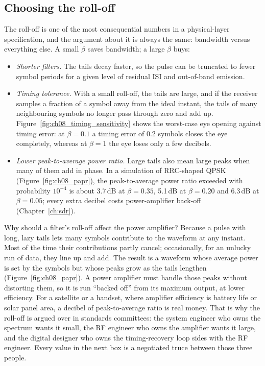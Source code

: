 \subsection{Choosing the roll-off}

The roll-off is one of the most consequential numbers in a physical-layer specification, and
the argument about it is always the same: bandwidth versus everything else. A small $\beta$
saves bandwidth; a large $\beta$ buys:
\begin{itemize}
\item \emph{Shorter filters.} The tails decay faster, so the pulse can be truncated to fewer
symbol periods for a given level of residual ISI and out-of-band emission.
\item \emph{Timing tolerance.} With a small roll-off, the tails are large, and if the receiver
samples a fraction of a symbol away from the ideal instant, the tails of many neighbouring
symbols no longer pass through zero and add up. Figure~\ref{fig:ch08_timing_sensitivity}
shows the worst-case eye opening against timing error: at $\beta=0.1$ a timing error of 0.2
symbols closes the eye completely, whereas at $\beta=1$ the eye loses only a few decibels.
\item \emph{Lower peak-to-average power ratio.} Large tails also mean large peaks when many of
them add in phase. In a simulation of RRC-shaped QPSK (Figure~\ref{fig:ch08_papr}), the
peak-to-average power ratio exceeded with probability $10^{-4}$ is about 3.7\,dB at
$\beta=0.35$, 5.1\,dB at $\beta=0.20$ and 6.3\,dB at $\beta=0.05$; every extra decibel costs
power-amplifier back-off (Chapter~\ref{ch:sdr}).
\end{itemize}



Why should a filter's roll-off affect the power amplifier? Because a pulse with long, lazy
tails lets many symbols contribute to the waveform at any instant. Most of the time their
contributions partly cancel; occasionally, for an unlucky run of data, they line up and add.
The result is a waveform whose average power is set by the symbols but whose peaks grow as the
tails lengthen (Figure~\ref{fig:ch08_papr}). A power amplifier must handle those peaks
without distorting them, so it is run ``backed off'' from its maximum output, at lower
efficiency. For a satellite or a handset, where amplifier efficiency is battery life or solar
panel area, a decibel of peak-to-average ratio is real money. That is why the roll-off is
argued over in standards committees: the system engineer who owns the spectrum wants it small,
the RF engineer who owns the amplifier wants it large, and the digital designer who owns the
timing-recovery loop sides with the RF engineer. Every value in the next box is a negotiated
truce between those three people.

